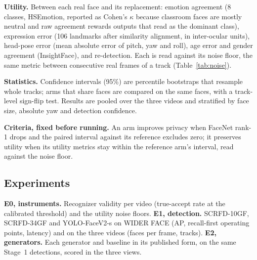 \textbf{Utility.} Between each real face and its replacement: emotion agreement
(8 classes, HSEmotion, reported as Cohen's $\kappa$ because classroom faces are
mostly neutral and raw agreement rewards outputs that read as the dominant
class), expression error (106 landmarks after similarity alignment, in
inter-ocular units), head-pose error (mean absolute error of pitch, yaw and
roll), age error and gender agreement (InsightFace), and re-detection. Each is
read against its noise floor, the same metric between consecutive real frames
of a track (Table~\ref{tab:noise}).

\textbf{Statistics.} Confidence intervals (95\%) are percentile bootstraps that
resample whole tracks; arms that share faces are compared on the same faces,
with a track-level sign-flip test. Results are pooled over the three videos and
stratified by face size, absolute yaw and detection confidence.

\textbf{Criteria, fixed before running.} An arm improves privacy when FaceNet
rank-1 drops and the paired interval against its reference excludes zero; it
preserves utility when its utility metrics stay within the reference arm's
interval, read against the noise floor.

\subsection{Experiments}

\textbf{E0, instruments.} Recognizer validity per video (true-accept rate at the
calibrated threshold) and the utility noise floors.
\textbf{E1, detection.} SCRFD-10GF, SCRFD-34GF and YOLO-FaceV2-s on WIDER FACE
(AP, recall-first operating points, latency) and on the three videos (faces per
frame, tracks).
\textbf{E2, generators.} Each generator and baseline in its published form, on
the same Stage~1 detections, scored in the three views.

